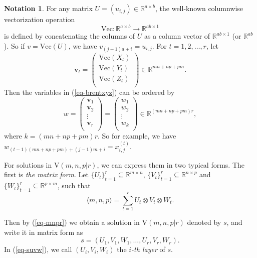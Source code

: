 \documentclass[reqno]{amsart}
\theoremstyle{definition}
\newtheorem{notation}[theorem]{Notation}
\numberwithin{equation}{section}
\theoremstyle{remark}
\begin{document}
\begin{notation}\label{nota-coord}
For any matrix $U=(u_{i,j})\in\mathbb{R}^{a\times b}$, the well-known columnwise vectorization operation
$$\mathrm{Vec} \colon \mathbb{R}^{a\times b} \to \mathbb{R}^{ab\times1}$$
is defined by concatenating the columns of $U$ as a column vector of $\mathbb{R}^{ab\times1}$ (or $\mathbb{R}^{ab}$). So if $v=\mathrm{Vec}(U)$, we have $v_{(j-1)a+i} =u_{i,j}$.
For $t=1,2,\dots,r$, let
$$\mathbf{v}_t=\left(
        \begin{array}{c}
         \mathrm{Vec}(X_t) \\
         \mathrm{Vec}(Y_t) \\
         \mathrm{Vec}(Z_t) \\
        \end{array}
      \right)\in \mathbb{R}^{mn+np+pm}.$$
Then the variables in (\ref{eq-brentxyz}) can be ordered by
\begin{equation}\label{eq-coordbrentvar}
w=\left(
    \begin{array}{c}
      \mathbf{v}_1 \\
      \mathbf{v}_2 \\
       \vdots\\
       \mathbf{v}_r\\
    \end{array}
  \right)=\left(
    \begin{array}{c}
      w_1 \\
      w_2 \\
      \vdots\\
      w_k\\
    \end{array}
  \right)
  \in \mathbb{R}^{(mn+np+pm)r},
\end{equation}
where $k=(mn+np+pm)r$. So for example, we have $w_{(t-1)(mn+np+pm)+(j-1)m+i}=x_{i,j}^{(t)}$. 
\end{notation}

For solutions in $\mathrm{V}(m,n,p|r)$, we can express them in two typical forms. The first is \emph{the matrix form}. Let
$\{U_{t}\}_{t=1}^r\subseteq \mathbb{R}^{m\times n}$, $\{V_{t}\}_{t=1}^r\subseteq \mathbb{R}^{n\times p}$ and $\{W_{t}\}_{t=1}^r\subseteq \mathbb{R}^{p\times m}$,
such that
\begin{equation*}
\langle m,n,p\rangle
=\sum_{t=1}^{r} U_{t}\otimes V_{t}\otimes W_{t}.
\end{equation*}

Then by (\ref{eq-mnpr}) we obtain a solution in $\mathrm{V}(m,n,p|r)$ denoted by $s$, and  write it in matrix form as
\begin{equation}\label{eq-suvw}
s=(U_1,V_1,W_1,\ldots,U_r,V_r,W_r).
\end{equation}
In (\ref{eq-suvw}), we call $(U_i,V_i,W_i)$ the \emph{$i$-th layer} of $s$.
\end{document}
